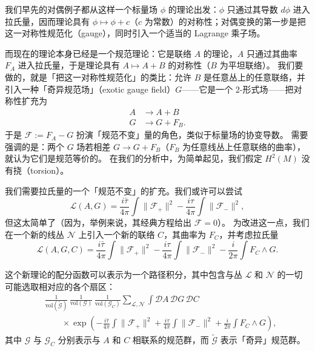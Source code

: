 我们早先的对偶例子都从这样一个标量场 $\phi$ 的理论出发：$\phi$ 只通过其导数 $d\phi$ 进入拉氏量，因而理论具有 $\phi\mapsto\phi+c$（$c$ 为常数）的对称性；对偶变换的第一步是把这一对称性规范化（gauge），同时引入一个适当的 Lagrange 乘子场。

而现在的理论本身已经是一个规范理论：它是联络 $A$ 的理论，$A$ 只通过其曲率 $F_{A}$ 进入拉氏量，于是理论具有 $A\mapsto A+B$ 的对称性（$B$ 为平坦联络）。
我们要做的，就是「把这一对称性规范化」的类比：允许 $B$ 是任意丛上的任意联络，并引入一种「奇异规范场」（exotic gauge field）$G$——它是一个 2-形式场——把对称性扩充为
\begin{equation}
  \tag{8.61}
  \label{eq:8-61}
  \begin{aligned}
  A&\to A+B\\
  G&\to G+F_{B}.
  \end{aligned}
\end{equation}
于是 $\mathcal{F}:=F_{A}-G$ 扮演「规范不变」量的角色，类似于标量场的协变导数。
需要强调的是：两个 $G$ 场若相差 $G\to G+F_{B}$（$F_{B}$ 为任意线丛上任意联络的曲率），就认为它们是规范等价的。
在我们的分析中，为简单起见，我们假定 $H^{2}(M)$ 没有挠（torsion）。

我们需要拉氏量的一个「规范不变」的扩充。我们或许可以尝试
\begin{equation}
  \tag{8.62}
  \label{eq:8-62}
  \mathcal{L}(A,G)=\frac{i\bar\tau}{4\pi}\int\|\mathcal{F}_{+}\|^{2}-\frac{i\tau}{4\pi}\int\|\mathcal{F}_{-}\|^{2},
\end{equation}
但这太简单了（因为，举例来说，其经典方程给出 $\mathcal{F}=0$）。
为改进这一点，我们在一个新的线丛 $\mathcal{N}$ 上引入一个新的联络 $C$，其曲率为 $F_{C}$，并考虑拉氏量
\begin{equation}
  \tag{8.63}
  \label{eq:8-63}
  \mathcal{L}(A,G,C)=\frac{i\bar\tau}{4\pi}\int\|\mathcal{F}_{+}\|^{2}-\frac{i\tau}{4\pi}\int\|\mathcal{F}_{-}\|^{2}-\frac{i}{2\pi}\int F_{C}\wedge G.
\end{equation}

这个新理论的配分函数可以表示为一个路径积分，其中包含与丛 $\mathcal{L}$ 和 $\mathcal{N}$ 的一切可能选取相对应的各个扇区：
\begin{equation}
  \tag{8.64}
  \label{eq:8-64}
  \begin{aligned}
  &\frac{1}{\mathrm{vol}(\widetilde{\mathcal{G}})}\,\frac{1}{\mathrm{vol}(\mathcal{G})}\,\frac{1}{\mathrm{vol}(\mathcal{G}_{C})}\sum_{\mathcal{L},\mathcal{N}}\int\mathcal{D}A\,\mathcal{D}G\,\mathcal{D}C\\
  &\qquad\times\exp\left(-\frac{i\bar\tau}{4\pi}\int\|\mathcal{F}_{+}\|^{2}+\frac{i\tau}{4\pi}\int\|\mathcal{F}_{-}\|^{2}+\frac{i}{2\pi}\int F_{C}\wedge G\right),
  \end{aligned}
\end{equation}
其中 $\mathcal{G}$ 与 $\mathcal{G}_{C}$ 分别表示与 $A$ 和 $C$ 相联系的规范群，而 $\widetilde{\mathcal{G}}$ 表示「奇异」规范群。

